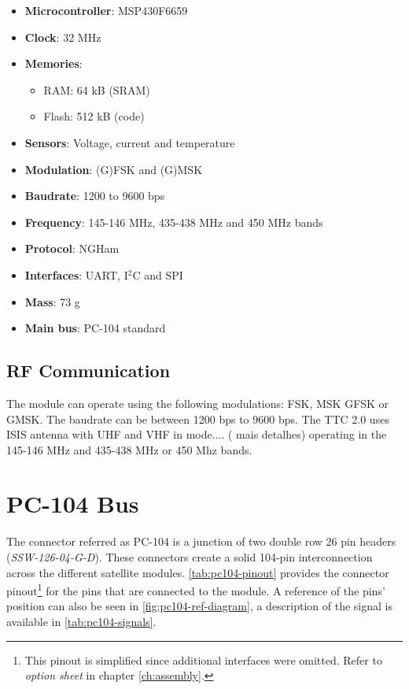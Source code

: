 \begin{itemize}
    \item \textbf{Microcontroller}: MSP430F6659
    \item \textbf{Clock}: 32 MHz
    \item \textbf{Memories}:
    \begin{itemize}
        \item RAM: 64 kB (SRAM)
        \item Flash: 512 kB (code)
    \end{itemize}
    \item \textbf{Sensors}: Voltage, current and temperature
    \item \textbf{Modulation}: (G)FSK and (G)MSK
    \item \textbf{Baudrate}: 1200 to 9600 bps
    \item \textbf{Frequency}: 145-146 MHz, 435-438 MHz and 450 MHz bands
    \item \textbf{Protocol}: NGHam
    \item \textbf{Interfaces}: UART, I$^{2}$C and SPI
    \item \textbf{Mass}: 73 g
    \item \textbf{Main bus}: PC-104 standard
\end{itemize}

\subsection{RF Communication}

The module can operate using the following modulations: FSK, MSK GFSK or GMSK. The baudrate can be between 1200 bps to 9600 bps. The TTC 2.0 uses ISIS antenna with UHF and VHF in mode.... ( mais detalhes) operating in the 145-146 MHz and 435-438 MHz or 450 Mhz bands.

\section{PC-104 Bus}

The connector referred as PC-104 is a junction of two double row 26 pin headers (\textit{SSW-126-04-G-D}). These connectors create a solid 104-pin interconnection across the different satellite modules. \autoref{tab:pc104-pinout} provides the connector pinout\footnote{This pinout is simplified since additional interfaces were omitted. Refer to \textit{option sheet} in chapter \ref{ch:assembly}.} for the pins that are connected to the module. A reference of the pins' position can also be seen in \autoref{fig:pc104-ref-diagram}, a description of the signal is available in \autoref{tab:pc104-signals}.

